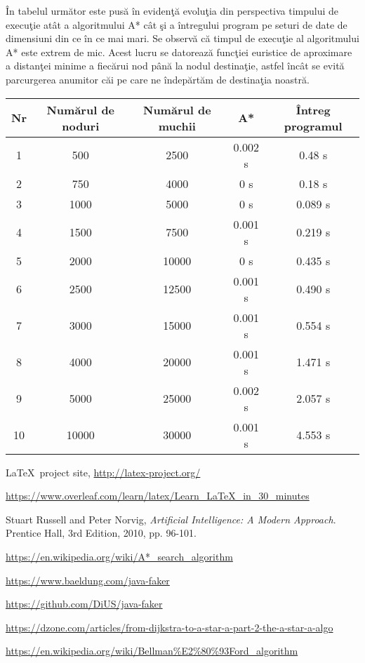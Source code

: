 \documentclass{article}
\begin{document}
\^{I}n tabelul urm\u{a}tor este pus\u{a} \^{i}n eviden\c{t}\u{a} evolu\c{t}ia din perspectiva timpului de execu\c{t}ie at\^{a}t a algoritmului A* c\^{a}t \c{s}i a \^{i}ntregului program pe seturi de date de dimensiuni din ce \^{i}n ce mai mari. Se observ\u{a} c\u{a} timpul de execu\c{t}ie al algoritmului A* este extrem de mic. Acest lucru se datoreaz\u{a} func\c{t}iei euristice de aproximare a distan\c{t}ei minime a fiec\u{a}rui nod p\^{a}n\u{a} la nodul destina\c{t}ie, astfel \^{i}nc\^{a}t se evit\u{a} parcurgerea anumitor c\u{a}i pe care ne \^{i}ndep\u{a}rt\u{a}m de destina\c{t}ia noastr\u{a}.
\begin{center}
\begin{tabular}{|c|c|c|c|c|}
    \hline
    Nr & Num\u{a}rul de noduri & Num\u{a}rul de muchii & A* & \^{I}ntreg programul \\
    \hline
    1 & 500 & 2500 & 0.002 s & 0.48 s  \\
    \hline
    2 & 750 & 4000 & 0 s & 0.18 s \\
    \hline
    3 & 1000 & 5000 & 0 s & 0.089 s \\
    \hline
    4 & 1500 & 7500 & 0.001 s & 0.219 s \\
    \hline
    5 & 2000 & 10000 & 0 s & 0.435 s \\
    \hline
    6 & 2500 & 12500 & 0.001 s & 0.490 s \\
    \hline
    7 & 3000 & 15000 & 0.001 s & 0.554 s \\
    \hline
    8 & 4000 & 20000 & 0.001 s & 1.471 s \\
    \hline
    9 & 5000 & 25000 & 0.002 s & 2.057 s \\
    \hline
    10 & 10000 & 30000 & 0.001 s & 4.553 s \\
    \hline
\end{tabular}
\end{center}


\begin{thebibliography}{9}
    
     \LaTeX~project site,
     \url{http://latex-project.org/}
    
     \url{https://www.overleaf.com/learn/latex/Learn_LaTeX_in_30_minutes}
     
	  Stuart Russell and Peter Norvig,
	  \emph{Artificial Intelligence: A Modern Approach}.
	  Prentice Hall,
	  3rd Edition,
	  2010,
	  pp. 96-101.
	  
	 \url{https://en.wikipedia.org/wiki/A*_search_algorithm}
	
	 \url{https://www.baeldung.com/java-faker}
	 
	 \url{https://github.com/DiUS/java-faker}
	 
	 \url{https://dzone.com/articles/from-dijkstra-to-a-star-a-part-2-the-a-star-a-algo}
	 
	  \url{https://en.wikipedia.org/wiki/Bellman%E2%80%93Ford_algorithm}
 
\end{thebibliography}
\end{document}
